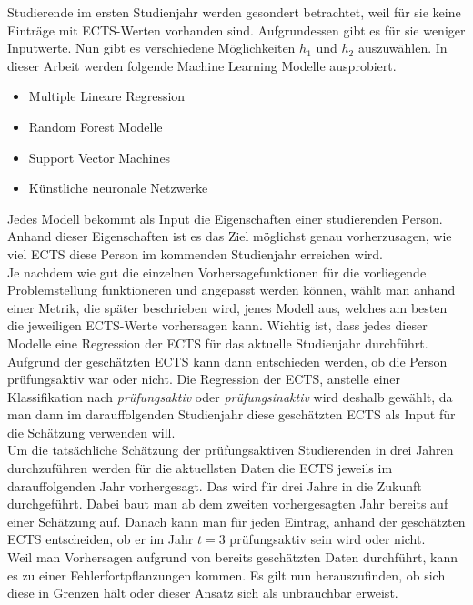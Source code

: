 Studierende im ersten Studienjahr werden gesondert betrachtet, weil f\"ur sie keine Eintr\"age mit ECTS-Werten vorhanden sind.
Aufgrundessen gibt es f\"ur sie weniger Inputwerte.
Nun gibt es verschiedene M\"oglichkeiten $h_1$ und $h_2$ auszuwählen. In dieser Arbeit
werden folgende Machine Learning Modelle ausprobiert.

\begin{itemize}
  \item Multiple Lineare Regression
  \item Random Forest Modelle
  \item Support Vector Machines
  \item K\"unstliche neuronale Netzwerke
\end{itemize}

Jedes Modell bekommt als Input die Eigenschaften einer studierenden Person. Anhand dieser Eigenschaften ist es das Ziel m\"oglichst genau
vorherzusagen, wie viel ECTS diese Person im kommenden Studienjahr erreichen wird. \\

Je nachdem wie gut die einzelnen Vorhersagefunktionen für die vorliegende Problemstellung funktioneren
und angepasst werden können, w\"ahlt man anhand einer Metrik, die sp\"ater beschrieben wird, jenes Modell aus, welches
am besten die jeweiligen ECTS-Werte vorhersagen kann.
Wichtig ist, dass jedes dieser Modelle eine Regression der ECTS f\"ur das aktuelle Studienjahr
durchf\"uhrt. Aufgrund der gesch\"atzten ECTS kann dann entschieden werden, ob die Person
pr\"ufungsaktiv war oder nicht. Die Regression der ECTS, anstelle einer Klassifikation nach
\textit{pr\"ufungsaktiv} oder \textit{pr\"ufungsinaktiv} wird deshalb gew\"ahlt, da man dann im darauffolgenden Studienjahr diese
gesch\"atzten ECTS als Input f\"ur die Sch\"atzung verwenden will.\\


Um die tats\"achliche Sch\"atzung der pr\"ufungsaktiven Studierenden in drei Jahren durchzuf\"uhren werden f\"ur die
aktuellsten Daten die ECTS jeweils im darauffolgenden Jahr vorhergesagt. Das wird f\"ur drei Jahre in die Zukunft durchgef\"uhrt.
Dabei baut man ab dem zweiten vorhergesagten Jahr
bereits auf einer Sch\"atzung auf. Danach kann man f\"ur jeden Eintrag, anhand der gesch\"atzten ECTS entscheiden, ob er im Jahr $t = 3$ pr\"ufungsaktiv sein wird oder nicht. \\

Weil man Vorhersagen aufgrund von bereits gesch\"atzten Daten durchf\"uhrt, kann es zu einer Fehlerfortpflanzungen kommen.
Es gilt nun herauszufinden, ob sich diese in Grenzen h\"alt oder dieser Ansatz sich als unbrauchbar erweist. \\





